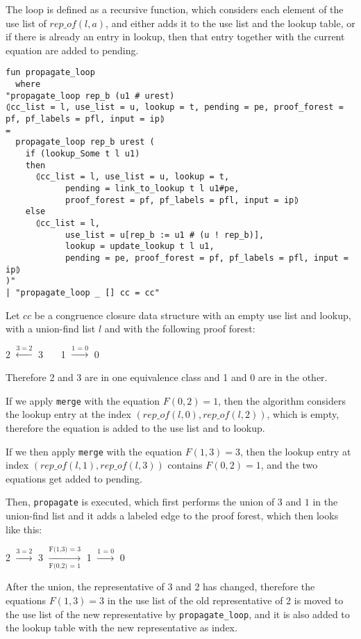 The loop is defined as a recursive function, which considers each element of the use list of $rep\_of(l, a)$, and either adds it to the use list and the lookup table, or if there is already an entry in lookup, then that entry together with the current equation are added to pending.

\begin{lstlisting}
fun propagate_loop
  where
"propagate_loop rep_b (u1 # urest)
⦇cc_list = l, use_list = u, lookup = t, pending = pe, proof_forest = pf, pf_labels = pfl, input = ip⦈
=
  propagate_loop rep_b urest (
    if (lookup_Some t l u1)
    then
      ⦇cc_list = l, use_list = u, lookup = t,
            pending = link_to_lookup t l u1#pe,
            proof_forest = pf, pf_labels = pfl, input = ip⦈
    else
      ⦇cc_list = l,
            use_list = u[rep_b := u1 # (u ! rep_b)],
            lookup = update_lookup t l u1,
            pending = pe, proof_forest = pf, pf_labels = pfl, input = ip⦈
)"
| "propagate_loop _ [] cc = cc"
\end{lstlisting}

\begin{exmp}\label{example:merge}
Let $cc$ be a congruence closure data structure with an empty use list and lookup, with a union-find list $l$ and with the following proof forest:

2 $\xleftarrow{3 = 2}$ 3 \ \ \ 1 $\xrightarrow{\text{1 = 0}}$ 0 \

Therefore 2 and 3 are in one equivalence class and 1 and 0 are in the other.

If we apply \lstinline{merge} with the equation $F(0,2) = 1$, then the algorithm considers the lookup entry at the index $(rep\_of(l, 0), rep\_of(l, 2))$, which is empty, therefore the equation is added to the use list and to lookup.

If we then apply \lstinline|merge| with the equation $F(1,3) = 3$, then the lookup entry at index $(rep\_of(l, 1), rep\_of(l, 3))$ contains $F(0,2) = 1$, and the two equations get added to pending.

Then, \lstinline|propagate| is executed, which first performs the union of $3$ and $1$ in the union-find list and it adds a labeled edge to the proof forest, which then looks like this:

2 $\xrightarrow{3 = 2}$ 3 $\xrightarrow[\text{F(0,2) = 1}]{\text{F(1,3) = 3}}$ 1 $\xrightarrow{\text{1 = 0}}$ 0 \

After the union, the representative of 3 and 2 has changed, therefore the equations $F(1,3) = 3$ in the use list of the old representative of 2 is moved to the use list of the new representative by \lstinline|propagate_loop|, and it is also added to the lookup table with the new representative as index.
\end{exmp}

